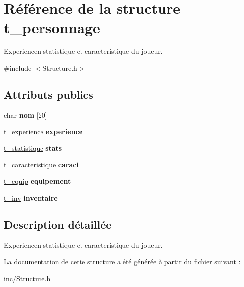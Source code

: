 \hypertarget{structt__personnage}{}\section{Référence de la structure t\+\_\+personnage}
\label{structt__personnage}


Experiencen statistique et caracteristique du joueur.  




{\ttfamily \#include $<$Structure.\+h$>$}

\subsection*{Attributs publics}
\begin{DoxyCompactItemize}
\item 
\hypertarget{structt__personnage_a9d86384625c825a331e99317dffd5f32}{}char {\bfseries nom} \mbox{[}20\mbox{]}\label{structt__personnage_a9d86384625c825a331e99317dffd5f32}

\item 
\hypertarget{structt__personnage_a16b22ad5924ff16f9bfd7c94f73b2b35}{}\hyperlink{structt__experience}{t\+\_\+experience} {\bfseries experience}\label{structt__personnage_a16b22ad5924ff16f9bfd7c94f73b2b35}

\item 
\hypertarget{structt__personnage_a428040db43564bd183c02ce9cfa9aa13}{}\hyperlink{structt__statistique}{t\+\_\+statistique} {\bfseries stats}\label{structt__personnage_a428040db43564bd183c02ce9cfa9aa13}

\item 
\hypertarget{structt__personnage_ad7fbbaa4ac560a0d113e4537f19938db}{}\hyperlink{structt__caracteristique}{t\+\_\+caracteristique} {\bfseries caract}\label{structt__personnage_ad7fbbaa4ac560a0d113e4537f19938db}

\item 
\hypertarget{structt__personnage_ad5de2ceaf1da932b2a50cc829bfb8416}{}\hyperlink{structt__equip}{t\+\_\+equip} {\bfseries equipement}\label{structt__personnage_ad5de2ceaf1da932b2a50cc829bfb8416}

\item 
\hypertarget{structt__personnage_a75f246b11bef2d2ad1026eb811c5d17c}{}\hyperlink{structt__inv}{t\+\_\+inv} {\bfseries inventaire}\label{structt__personnage_a75f246b11bef2d2ad1026eb811c5d17c}

\end{DoxyCompactItemize}


\subsection{Description détaillée}
Experiencen statistique et caracteristique du joueur. 

La documentation de cette structure a été générée à partir du fichier suivant \+:\begin{DoxyCompactItemize}
\item 
inc/\hyperlink{Structure_8h}{Structure.\+h}\end{DoxyCompactItemize}
